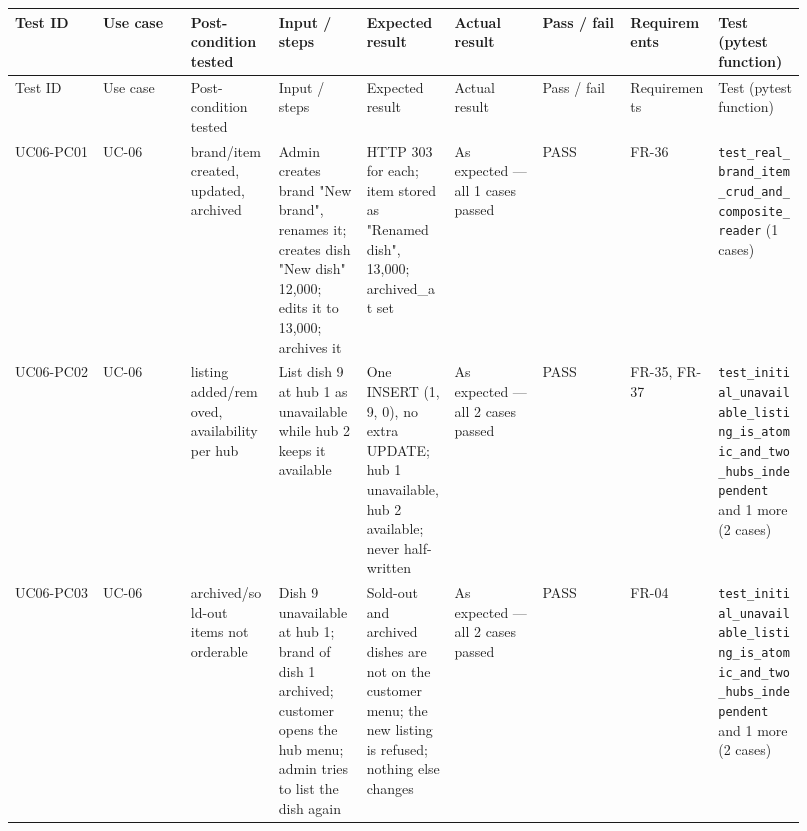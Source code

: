 \begin{landscape}
\begingroup\footnotesize
\begin{longtable}{>{\raggedright\arraybackslash}p{0.1022\linewidth}>{\raggedright\arraybackslash}p{0.1022\linewidth}>{\raggedright\arraybackslash}p{0.1022\linewidth}>{\raggedright\arraybackslash}p{0.1022\linewidth}>{\raggedright\arraybackslash}p{0.1022\linewidth}>{\raggedright\arraybackslash}p{0.1022\linewidth}>{\raggedright\arraybackslash}p{0.1022\linewidth}>{\raggedright\arraybackslash}p{0.1022\linewidth}>{\raggedright\arraybackslash}p{0.1022\linewidth}}
Test ID & Use case & Post-condition tested & Input / steps & Expected result & Actual result & Pass / fail & Requirements & Test (pytest function) \\
\hline\endfirsthead
Test ID & Use case & Post-condition tested & Input / steps & Expected result & Actual result & Pass / fail & Requirements & Test (pytest function) \\
\hline\endhead
UC06-PC01 & UC-06 & brand/item created, updated, archived & Admin creates brand "New brand", renames it; creates dish "New dish" 12,000; edits it to 13,000; archives it & HTTP 303 for each; item stored as "Renamed dish", 13,000; archived\_at set & As expected --- all 1 cases passed & PASS & FR-36 & \texttt{test\_\allowbreak{}real\_\allowbreak{}brand\_\allowbreak{}item\_\allowbreak{}crud\_\allowbreak{}and\_\allowbreak{}composite\_\allowbreak{}reader} (1 cases) \\
UC06-PC02 & UC-06 & listing added/removed, availability per hub & List dish 9 at hub 1 as unavailable while hub 2 keeps it available & One INSERT (1, 9, 0), no extra UPDATE; hub 1 unavailable, hub 2 available; never half-written & As expected --- all 2 cases passed & PASS & FR-35, FR-37 & \texttt{test\_\allowbreak{}initial\_\allowbreak{}unavailable\_\allowbreak{}listing\_\allowbreak{}is\_\allowbreak{}atomic\_\allowbreak{}and\_\allowbreak{}two\_\allowbreak{}hubs\_\allowbreak{}independent} and 1 more (2 cases) \\
UC06-PC03 & UC-06 & archived/sold-out items not orderable & Dish 9 unavailable at hub 1; brand of dish 1 archived; customer opens the hub menu; admin tries to list the dish again & Sold-out and archived dishes are not on the customer menu; the new listing is refused; nothing else changes & As expected --- all 2 cases passed & PASS & FR-04 & \texttt{test\_\allowbreak{}initial\_\allowbreak{}unavailable\_\allowbreak{}listing\_\allowbreak{}is\_\allowbreak{}atomic\_\allowbreak{}and\_\allowbreak{}two\_\allowbreak{}hubs\_\allowbreak{}independent} and 1 more (2 cases) \\

\end{longtable}
\end{landscape}
